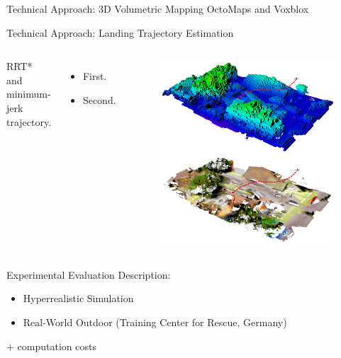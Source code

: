 \documentclass{beamer}
\begin{document}
    \begin{frame}{Technical Approach: 3D Volumetric Mapping}
        OctoMaps and Voxblox
    \end{frame}

    \begin{frame}{Technical Approach: Landing Trajectory Estimation}
        \begin{columns}[c,onlytextwidth]
                RRT* and minimum-jerk trajectory.
                \begin{itemize}
                    \item First.
                    \item Second.
                \end{itemize}

                \begin{figure}
                    \centering
                    \includegraphics[width=\textwidth]{images/Fig4.png}
                \end{figure}
        \end{columns}
    \end{frame}

    \begin{frame}{Experimental Evaluation}
        Description:
        \begin{itemize}
            \item Hyperrealistic Simulation
            \item Real-World Outdoor (Training Center for Rescue, Germany)
        \end{itemize}
        + computation costs
    \end{frame}
\end{document}
